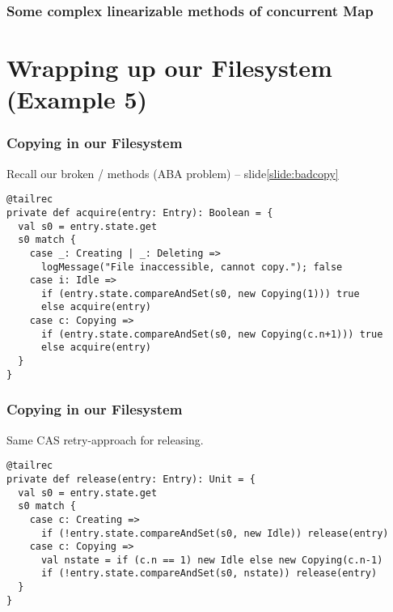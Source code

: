 \documentclass[aspectratio=169]{beamer}
\begin{document}
\begin{frame}\frametitle{Some complex linearizable methods of concurrent Map}
    \centering

\end{frame}


\section*{Wrapping up our Filesystem (Example 5)}

\begin{frame}[fragile]\frametitle{Copying in our Filesystem}
    Recall our \alert{broken} / methods (\alert{ABA problem}) -- slide\ref{slide:badcopy}

\begin{lstlisting}[emph={execute,sleep,log,Copying,acquire,compareAndSet}]
@tailrec
private def acquire(entry: Entry): Boolean = {
  val s0 = entry.state.get
  s0 match {
    case _: Creating | _: Deleting =>
      logMessage("File inaccessible, cannot copy."); false
    case i: Idle =>
      if (entry.state.compareAndSet(s0, new Copying(1))) true
      else acquire(entry)
    case c: Copying =>
      if (entry.state.compareAndSet(s0, new Copying(c.n+1))) true
      else acquire(entry)
  }
}
\end{lstlisting}
\end{frame}


\begin{frame}[fragile]\frametitle{Copying in our Filesystem}
    Same CAS retry-approach for releasing.

\begin{lstlisting}[emph={execute,sleep,log,Copying,release,compareAndSet}]
@tailrec
private def release(entry: Entry): Unit = {
  val s0 = entry.state.get
  s0 match {
    case c: Creating =>
      if (!entry.state.compareAndSet(s0, new Idle)) release(entry)
    case c: Copying =>
      val nstate = if (c.n == 1) new Idle else new Copying(c.n-1)
      if (!entry.state.compareAndSet(s0, nstate)) release(entry)
  }
}
\end{lstlisting}
\end{frame}
\end{document}
